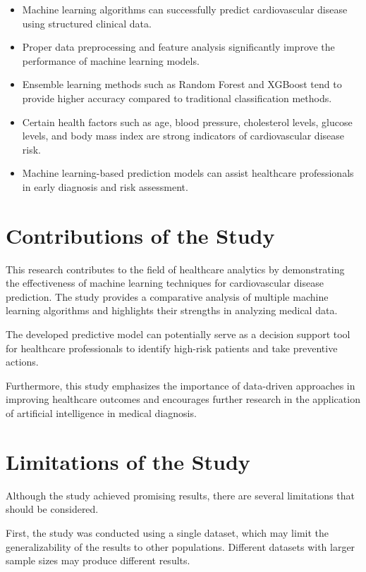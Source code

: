 \begin{itemize}
\item Machine learning algorithms can successfully predict cardiovascular disease using structured clinical data.
\item Proper data preprocessing and feature analysis significantly improve the performance of machine learning models.
\item Ensemble learning methods such as Random Forest and XGBoost tend to provide higher accuracy compared to traditional classification methods.
\item Certain health factors such as age, blood pressure, cholesterol levels, glucose levels, and body mass index are strong indicators of cardiovascular disease risk.
\item Machine learning-based prediction models can assist healthcare professionals in early diagnosis and risk assessment.
\end{itemize}

\section{Contributions of the Study}

This research contributes to the field of healthcare analytics by demonstrating the effectiveness of machine learning techniques for cardiovascular disease prediction. The study provides a comparative analysis of multiple machine learning algorithms and highlights their strengths in analyzing medical data.

The developed predictive model can potentially serve as a decision support tool for healthcare professionals to identify high-risk patients and take preventive actions.

Furthermore, this study emphasizes the importance of data-driven approaches in improving healthcare outcomes and encourages further research in the application of artificial intelligence in medical diagnosis.

\section{Limitations of the Study}

Although the study achieved promising results, there are several limitations that should be considered.

First, the study was conducted using a single dataset, which may limit the generalizability of the results to other populations. Different datasets with larger sample sizes may produce different results.

